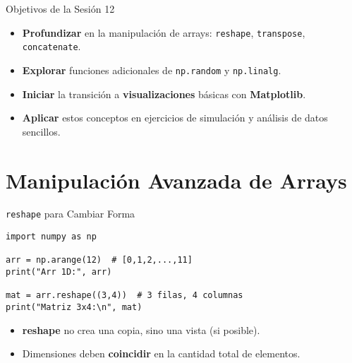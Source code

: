 \documentclass[10pt]{beamer}
\begin{document}
\begin{frame}{Objetivos de la Sesión 12}
  \begin{itemize}
    \item \textbf{Profundizar} en la manipulación de arrays: \texttt{reshape}, \texttt{transpose}, \texttt{concatenate}.
    \item \textbf{Explorar} funciones adicionales de \texttt{np.random} y \texttt{np.linalg}.
    \item \textbf{Iniciar} la transición a \textbf{visualizaciones} básicas con \textbf{Matplotlib}.
    \item \textbf{Aplicar} estos conceptos en ejercicios de simulación y análisis de datos sencillos.
  \end{itemize}
\end{frame}

\section{Manipulación Avanzada de Arrays}

\begin{frame}[fragile]{\texttt{reshape} para Cambiar Forma}
\begin{verbatim}
import numpy as np

arr = np.arange(12)  # [0,1,2,...,11]
print("Arr 1D:", arr)

mat = arr.reshape((3,4))  # 3 filas, 4 columnas
print("Matriz 3x4:\n", mat)
\end{verbatim}
\begin{itemize}
  \item \textbf{reshape} no crea una copia, sino una vista (si posible).
  \item Dimensiones deben \textbf{coincidir} en la cantidad total de elementos.
\end{itemize}
\end{frame}
\end{document}
